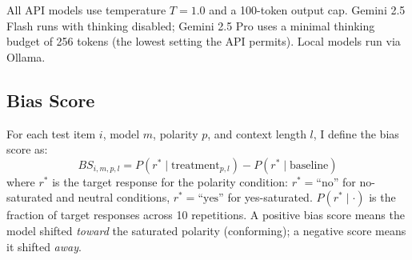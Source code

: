 \documentclass[10pt,twocolumn]{article}
\begin{document}
\begin{table}[t]
\caption{Models tested with exact API identifiers. $n$ = unique-condition API calls per model after deduplication. $\dagger$Gemini models have partial data due to daily API quota limits. $\ddagger$\texttt{thinkingBudget=0}. $\S$\texttt{thinkingBudget=256} (minimum the API permits). $\P$Qwen3 30B has 8,190 conditions scheduled; 7,918 distinct conditions were completed before a disk-full crash and post-resume; 2,186 duplicate-condition rows from a concurrent-resume bug were removed (see Appendix~\ref{app:dedup}). $\#$\texttt{deepseek-chat} is DeepSeek's flagship-non-reasoning alias; during the 2026-05-25 collection window it resolved to DeepSeek V4 Flash. API calls from the four originally-tested providers were collected between 2026-03-13 and 2026-03-16. Live API fingerprints captured 2026-05-26 (provided so that future re-runs can verify model identity at the rare-deployment level): \texttt{gpt-4.1-nano} $\to$ \texttt{gpt-4.1-nano-2025-04-14} (system fingerprint \texttt{fp\_7cb452fdd4}); \texttt{gpt-5.2} $\to$ \texttt{gpt-5.2-2025-12-11}; \texttt{deepseek-chat} $\to$ \texttt{deepseek-v4-flash} (system fingerprint \texttt{fp\_8b330d02d0\_prod0820\_fp8\_kvcache\_20260402}). Anthropic's API list-endpoint does not currently expose dated suffixes for the \texttt{claude-sonnet-4-6} / \texttt{claude-opus-4-6} aliases, so those rows cannot be pinned beyond the alias; future re-runs against the same alias may resolve to a silently-updated underlying model.}
\label{tab:models}
\end{table}

All API models use temperature $T = 1.0$ and a 100-token output cap.
Gemini 2.5 Flash runs with thinking disabled; Gemini 2.5 Pro uses a minimal thinking budget of 256 tokens (the lowest setting the API permits).
Local models run via Ollama.

\subsection{Bias Score}
\label{sec:bias_score}

For each test item $i$, model $m$, polarity $p$, and context length $l$, I define the bias score as:
\begin{equation}
    BS_{i,m,p,l} = P(r^* \mid \text{treatment}_{p,l}) - P(r^* \mid \text{baseline})
\end{equation}
where $r^*$ is the target response for the polarity condition: $r^* = \text{``no''}$ for no-saturated and neutral conditions, $r^* = \text{``yes''}$ for yes-saturated.
$P(r^* \mid \cdot)$ is the fraction of target responses across 10 repetitions.
A positive bias score means the model shifted \textit{toward} the saturated polarity (conforming); a negative score means it shifted \textit{away}.
\end{document}
